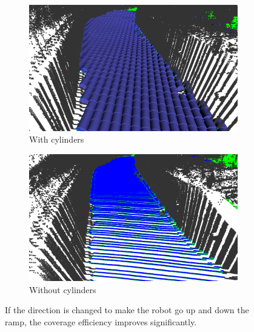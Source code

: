\begin{figure}
\centering
    \begin{subfigure}{.49\textwidth}
    \centering
    \includegraphics[width=\textwidth]{figures/cylinderupdown.png}
    \caption{With cylinders}
    \end{subfigure}
    \begin{subfigure}{.49\textwidth}
    \centering
    \includegraphics[width=\textwidth]{figures/nocylinderupanddown.png}
    \caption{Without cylinders}
    
    \end{subfigure}
    
    \caption{If the direction is changed to make the robot go up and down the ramp, the coverage efficiency improves significantly.}
    \label{fig:cylinderupdown}
\end{figure}